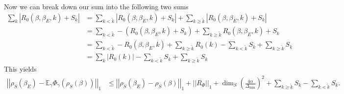 \documentclass{article}
\newcommand{\parens}[1]{\left( #1 \right)}
\newcommand{\abs}[1]{\left| #1 \right|}
\newcommand{\norm}[1]{\left| \left| #1 \right| \right|}
\begin{document}
Now we can break down our sum into the following two sums
\begin{align}
    \sum_k \abs{R_0(\beta, \beta_E, k) + S_k} &= \sum_{k < \widetilde{k}} \abs{R_0(\beta, \beta_E, k) + S_k} + \sum_{k \geq \widetilde{k}} \abs{R_0(\beta, \beta_E, k) + S_k} \\
    &= \sum_{k < \widetilde{k}} -(R_0(\beta, \beta_E, k) + S_k) + \sum_{k \geq \widetilde{k}} R_0(\beta, \beta_E, k) + S_k \\ 
    &= \sum_{k < \widetilde{k}} -R_0(\beta, \beta_E, k) + \sum_{k \geq \widetilde{k}} R_0(k) - \sum_{k < \widetilde{k}} S_k + \sum_{k \geq \widetilde{k}} S_k \\
    &= \sum_k \abs{R_0(k)} - \sum_{k < \widetilde{k}} S_k + \sum_{k \geq \widetilde{k}} S_k
\end{align}
This yields
\begin{align}
    \norm{\rho_S(\beta_E) - \mathbb{E}_{\gamma} \Phi_{\gamma}(\rho_S(\beta))}_1 &\leq \norm{\rho_S(\beta_E) - \rho_S(\beta)}_1 + \norm{R_{\Phi}}_1 + \dim_S \parens{\frac{4 \alpha}{\Delta_{\min}}}^2 + \sum_{k \geq \widetilde{k}} S_k - \sum_{k < \widetilde{k}} S_k.
\end{align}
\end{document}
